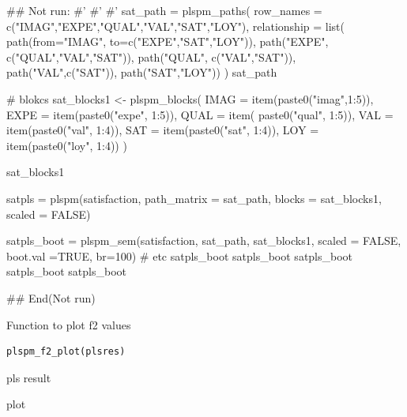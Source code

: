 \documentclass[a4paper]{book}
\begin{document}
\begin{Examples}
\begin{ExampleCode}

## Not run: 
#'
#' #'
sat_path = plspm_paths(
  row_names = c("IMAG","EXPE","QUAL","VAL","SAT","LOY"),
  relationship = list(
    path(from="IMAG", to=c("EXPE","SAT","LOY")),
    path("EXPE", c("QUAL","VAL","SAT")),
    path("QUAL", c("VAL","SAT")),
    path("VAL",c("SAT")),
    path("SAT","LOY"))
)
sat_path

# blokcs
sat_blocks1 <- plspm_blocks(
  IMAG = item(paste0("imag",1:5)),
  EXPE = item(paste0("expe", 1:5)),
  QUAL = item( paste0("qual", 1:5)),
  VAL = item(paste0("val", 1:4)),
  SAT = item(paste0("sat", 1:4)),
  LOY = item(paste0("loy", 1:4))
)

sat_blocks1

satpls = plspm(satisfaction,
               path_matrix = sat_path,
               blocks = sat_blocks1,
               scaled = FALSE)

satpls_boot = plspm_sem(satisfaction, sat_path, sat_blocks1, scaled = FALSE,
                        boot.val =TRUE, br=100)
# etc
satpls_boot%
satpls_boot%
satpls_boot%
satpls_boot%
satpls_boot%

## End(Not run)



\end{ExampleCode}
\end{Examples}
%
\begin{Description}
Function to plot f2 values
\end{Description}
%
\begin{Usage}
\begin{verbatim}
plspm_f2_plot(plsres)
\end{verbatim}
\end{Usage}
%
\begin{Arguments}
\begin{ldescription}
\item[\code{plsres}] pls result
\end{ldescription}
\end{Arguments}
%
\begin{Value}
plot
\end{Value}
%
\end{document}
